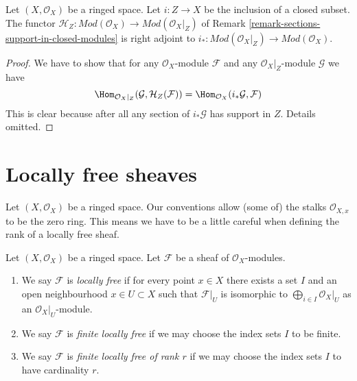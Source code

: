 \begin{lemma}
\label{lemma-adjoint-section-with-support}
Let $(X, \mathcal{O}_X)$ be a ringed space. Let $i : Z \to X$ be the
inclusion of a closed subset. The functor
$\mathcal{H}_Z : \textit{Mod}(\mathcal{O}_X) \to
\textit{Mod}(\mathcal{O}_X|_Z)$ of
Remark \ref{remark-sections-support-in-closed-modules}
is right adjoint to
$i_* : \textit{Mod}(\mathcal{O}_X|_Z) \to \textit{Mod}(\mathcal{O}_X)$.
\end{lemma}

\begin{proof}
We have to show that for any $\mathcal{O}_X$-module $\mathcal{F}$
and any $\mathcal{O}_X|_Z$-module $\mathcal{G}$ we have
$$
\Hom_{\mathcal{O}_X|_Z}(\mathcal{G}, \mathcal{H}_Z(\mathcal{F})) =
\Hom_{\mathcal{O}_X}(i_*\mathcal{G}, \mathcal{F})
$$
This is clear
because after all any section of $i_*\mathcal{G}$ has support in $Z$.
Details omitted.
\end{proof}










\section{Locally free sheaves}
\label{section-locally-free}

\noindent
Let $(X, \mathcal{O}_X)$ be a ringed space.
Our conventions allow (some of) the stalks $\mathcal{O}_{X, x}$
to be the zero ring. This means we have to be a little careful
when defining the rank of a locally free sheaf.

\begin{definition}
\label{definition-locally-free}
Let $(X, \mathcal{O}_X)$ be a ringed space.
Let $\mathcal{F}$ be a sheaf of $\mathcal{O}_X$-modules.
\begin{enumerate}
\item We say $\mathcal{F}$ is {\it locally free} if for every
point $x \in X$ there exists a set $I$ and an open
neighbourhood $x \in U \subset X$
such that $\mathcal{F}|_U$ is isomorphic to
$\bigoplus_{i \in I} \mathcal{O}_X|_U$ as an $\mathcal{O}_X|_U$-module.
\item We say $\mathcal{F}$ is {\it finite locally free} if we may
choose the index sets $I$ to be finite.
\item We say $\mathcal{F}$ is {\it finite locally free of rank $r$}
if we may choose the index sets $I$ to have cardinality $r$.
\end{enumerate}
\end{definition}

